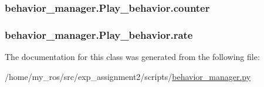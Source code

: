 \subsubsection[{\texorpdfstring{counter}{counter}}]{\setlength{\rightskip}{0pt plus 5cm}behavior\+\_\+manager.\+Play\+\_\+behavior.\+counter}\hypertarget{classbehavior__manager_1_1Play__behavior_a9ef35e23e54823711001f1d3ca3a3c76}{}\label{classbehavior__manager_1_1Play__behavior_a9ef35e23e54823711001f1d3ca3a3c76}
\subsubsection[{\texorpdfstring{rate}{rate}}]{\setlength{\rightskip}{0pt plus 5cm}behavior\+\_\+manager.\+Play\+\_\+behavior.\+rate}\hypertarget{classbehavior__manager_1_1Play__behavior_af636412228a2da30ad114266cbd121e3}{}\label{classbehavior__manager_1_1Play__behavior_af636412228a2da30ad114266cbd121e3}


The documentation for this class was generated from the following file\+:\begin{DoxyCompactItemize}
\item 
/home/my\+\_\+ros/src/exp\+\_\+assignment2/scripts/\hyperlink{behavior__manager_8py}{behavior\+\_\+manager.\+py}\end{DoxyCompactItemize}

